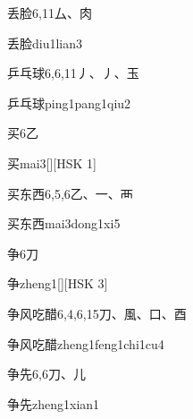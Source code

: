 \begin{entry}{丢脸}{6,11}{⼛、⾁}
  \begin{phonetics}{丢脸}{diu1lian3}
  \end{phonetics}
\end{entry}

\begin{entry}{乒乓球}{6,6,11}{⼃、⼃、⽟}
  \begin{phonetics}{乒乓球}{ping1pang1qiu2}
  \end{phonetics}
\end{entry}

\begin{entry}{买}{6}{⼄}
  \begin{phonetics}{买}{mai3}[][HSK 1]
  \end{phonetics}
\end{entry}

\begin{entry}{买东西}{6,5,6}{⼄、⼀、⾑}
  \begin{phonetics}{买东西}{mai3dong1xi5}
  \end{phonetics}
\end{entry}

\begin{entry}{争}{6}{⼑}
  \begin{phonetics}{争}{zheng1}[][HSK 3]
  \end{phonetics}
\end{entry}

\begin{entry}{争风吃醋}{6,4,6,15}{⼑、⾵、⼝、⾣}
  \begin{phonetics}{争风吃醋}{zheng1feng1chi1cu4}
  \end{phonetics}
\end{entry}

\begin{entry}{争先}{6,6}{⼑、⼉}
  \begin{phonetics}{争先}{zheng1xian1}
  \end{phonetics}
\end{entry}

